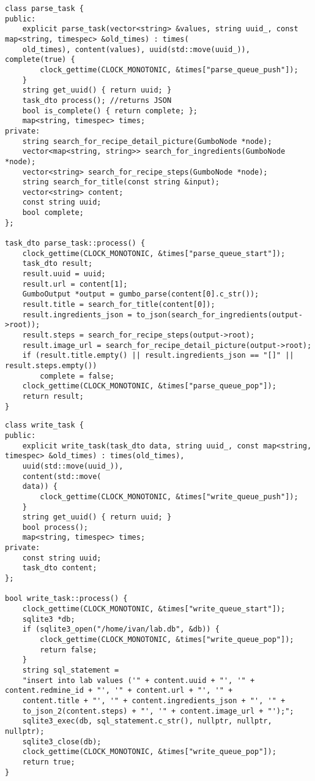 \clearpage
\begin{lstlisting}[caption={Класс задачи на этапе обработки содержимого файла}, label=lst:parse]
class parse_task {
public:
	explicit parse_task(vector<string> &values, string uuid_, const map<string, timespec> &old_times) : times(
	old_times), content(values), uuid(std::move(uuid_)), complete(true) {
		clock_gettime(CLOCK_MONOTONIC, &times["parse_queue_push"]);
	}
	string get_uuid() { return uuid; }
	task_dto process(); //returns JSON
	bool is_complete() { return complete; };
	map<string, timespec> times;
private:
	string search_for_recipe_detail_picture(GumboNode *node);
	vector<map<string, string>> search_for_ingredients(GumboNode *node);
	vector<string> search_for_recipe_steps(GumboNode *node);
	string search_for_title(const string &input);
	vector<string> content;
	const string uuid;
	bool complete;
};

task_dto parse_task::process() {
	clock_gettime(CLOCK_MONOTONIC, &times["parse_queue_start"]);
	task_dto result;
	result.uuid = uuid;
	result.url = content[1];
	GumboOutput *output = gumbo_parse(content[0].c_str());
	result.title = search_for_title(content[0]);
	result.ingredients_json = to_json(search_for_ingredients(output->root));
	result.steps = search_for_recipe_steps(output->root);
	result.image_url = search_for_recipe_detail_picture(output->root);
	if (result.title.empty() || result.ingredients_json == "[]" || result.steps.empty())
		complete = false;
	clock_gettime(CLOCK_MONOTONIC, &times["parse_queue_pop"]);
	return result;
}
\end{lstlisting}
\clearpage
\begin{lstlisting}[caption={Класс задачи на этапе записи в базу данных}, label=lst:write]
class write_task {
public:
	explicit write_task(task_dto data, string uuid_, const map<string, timespec> &old_times) : times(old_times),
	uuid(std::move(uuid_)),
	content(std::move(
	data)) {
		clock_gettime(CLOCK_MONOTONIC, &times["write_queue_push"]);
	}
	string get_uuid() { return uuid; }
	bool process();
	map<string, timespec> times;
private:
	const string uuid;
	task_dto content;
};

bool write_task::process() {
	clock_gettime(CLOCK_MONOTONIC, &times["write_queue_start"]);
	sqlite3 *db;
	if (sqlite3_open("/home/ivan/lab.db", &db)) {
		clock_gettime(CLOCK_MONOTONIC, &times["write_queue_pop"]);
		return false;
	}
	string sql_statement =
	"insert into lab values ('" + content.uuid + "', '" + content.redmine_id + "', '" + content.url + "', '" +
	content.title + "', '" + content.ingredients_json + "', '" +
	to_json_2(content.steps) + "', '" + content.image_url + "');";
	sqlite3_exec(db, sql_statement.c_str(), nullptr, nullptr, nullptr);
	sqlite3_close(db);
	clock_gettime(CLOCK_MONOTONIC, &times["write_queue_pop"]);
	return true;
}
\end{lstlisting}

